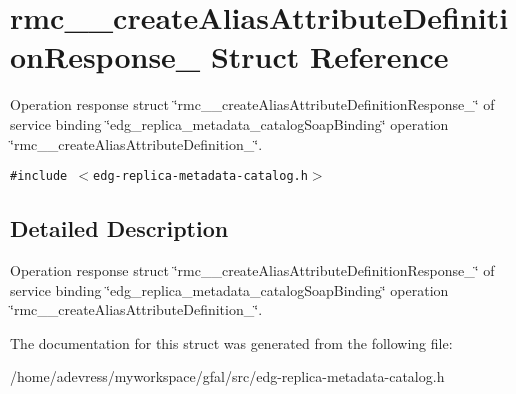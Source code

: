 \section{rmc\_\-\_\-create\-Alias\-Attribute\-Definition\-Response\_\- Struct Reference}
\label{structrmc____createAliasAttributeDefinitionResponse__}
Operation response struct \char`\"{}rmc\_\-\_\-create\-Alias\-Attribute\-Definition\-Response\_\-\char`\"{} of service binding \char`\"{}edg\_\-replica\_\-metadata\_\-catalog\-Soap\-Binding\char`\"{} operation \char`\"{}rmc\_\-\_\-create\-Alias\-Attribute\-Definition\_\-\char`\"{}.  


{\tt \#include $<$edg-replica-metadata-catalog.h$>$}



\subsection{Detailed Description}
Operation response struct \char`\"{}rmc\_\-\_\-create\-Alias\-Attribute\-Definition\-Response\_\-\char`\"{} of service binding \char`\"{}edg\_\-replica\_\-metadata\_\-catalog\-Soap\-Binding\char`\"{} operation \char`\"{}rmc\_\-\_\-create\-Alias\-Attribute\-Definition\_\-\char`\"{}. 



The documentation for this struct was generated from the following file:\begin{CompactItemize}
\item 
/home/adevress/myworkspace/gfal/src/edg-replica-metadata-catalog.h\end{CompactItemize}
